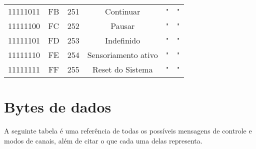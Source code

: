 \begin{center}
\begin{supertabular}{| c | c | c | c | c | c |}
                11111011 & FB & 251 &                 Continuar                       &                 "                    &                   "                  \\
             11111100 & FC & 252 &                  Pausar                         &                 "                    &                   "                  \\
                11111101 & FD & 253 &                 Indefinido                      &                 "                    &                   "                  \\
             11111110 & FE & 254 &             Sensoriamento ativo                 &                 "                    &                   "                  \\
                11111111 & FF & 255 &               Reset do Sistema                  &                 "                    &                   "                  \\
        \end{supertabular}
        \end{center}
        
    \section{Bytes de dados}
    
        A seguinte tabela é uma referência de todas os possíveis mensagens de controle e modos de canais, além de citar o que cada uma delas representa.
        

